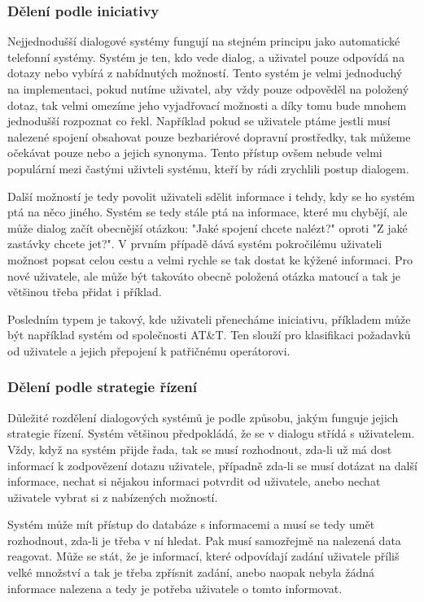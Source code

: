 \subsubsection{Dělení podle iniciativy}

Nejjednodušší dialogové systémy fungují na stejném principu jako automatické
telefonní systémy. Systém je ten, kdo vede dialog, a uživatel pouze odpovídá na
dotazy nebo vybírá z nabídnutých možností. Tento systém je velmi jednoduchý na
implementaci, pokud nutíme uživatel, aby vždy pouze odpověděl na položený
dotaz, tak velmi omezíme jeho vyjadřovací možnosti a díky tomu bude mnohem
jednodušší rozpoznat co řekl. Například pokud se uživatele ptáme jestli musí
nalezené spojení obsahovat pouze bezbariérové dopravní prostředky, tak můžeme
očekávat pouze  nebo  a jejich synonyma. Tento přístup ovšem
nebude velmi populární mezi častými uživteli systému, kteří by rádi zrychlili
postup dialogem.

Další možností je tedy povolit uživateli sdělit informace i tehdy, kdy se ho
systém ptá na něco jiného. Systém se tedy stále ptá na informace, které mu
chybějí, ale může dialog začít obecnější otázkou: "Jaké spojení chcete nalézt?"
oproti "Z jaké zastávky chcete jet?". V prvním případě dává systém pokročilému
uživateli možnost popsat celou cestu a velmi rychle se tak dostat ke kýžené
informaci. Pro nové uživatele, ale může být takováto obecně položená otázka
matoucí a tak je většinou třeba přidat i příklad.

Posledním typem je takový, kde uživateli přenecháme iniciativu, příkladem může
být například systém   od
společnosti AT\&T. Ten slouží pro klasifikaci požadavků od uživatele a jejich
přepojení k patřičnému operátorovi.

\subsubsection{Dělení podle strategie řízení}

Důležité rozdělení dialogových systémů je podle způsobu, jakým funguje jejich
strategie řízení. Systém většinou předpokládá, že se v dialogu střídá s
uživatelem. Vždy, když na systém přijde řada, tak se musí rozhodnout, zda-li už
má dost informací k zodpovězení dotazu uživatele, případně zda-li se musí
dotázat na další informace, nechat si nějakou informaci potvrdit od uživatele,
anebo nechat uživatele vybrat si z nabízených možností.

Systém může mít přístup do databáze s informacemi a musí se tedy umět
rozhodnout, zda-li je třeba v ní hledat. Pak musí samozřejmě na nalezená data
reagovat. Může se stát, že je informací, které odpovídají zadání uživatele
příliš velké množství a tak je třeba zpřísnit zadání, anebo naopak nebyla žádná
informace nalezena a tedy je potřeba uživatele o tomto informovat.

